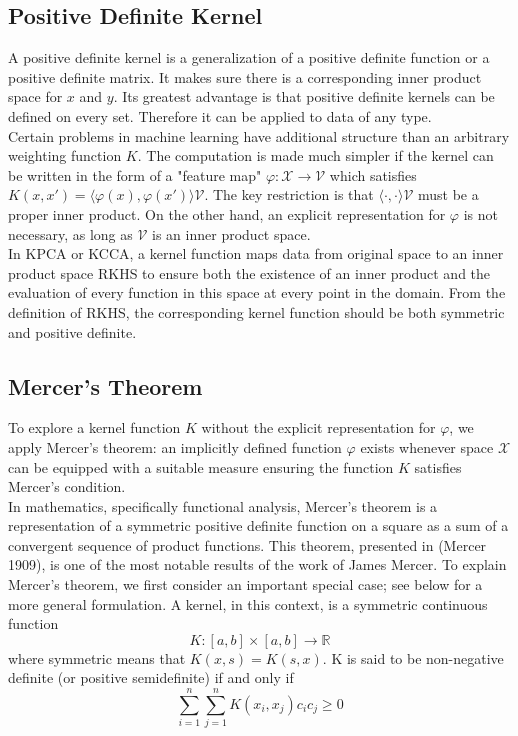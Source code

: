 \documentclass[12pt]{report} %
\begin{document}
\subsection{Positive Definite Kernel}
A positive definite kernel is a generalization of a positive definite function or a positive definite matrix. It makes sure there is a corresponding inner product space for $x$ and $y$. Its greatest advantage is that positive definite kernels can be defined on every set. Therefore it can be applied to data of any type.\\
Certain problems in machine learning have additional structure than an arbitrary weighting function $K$. The computation is made much simpler if the kernel can be written in the form of a "feature map" $\varphi:\mathcal{X}\to\mathcal{V}$ which satisfies $K(x,x')=\langle \varphi (x), \varphi (x') \rangle \mathcal{V}$. The key restriction is that $\langle \cdot, \cdot \rangle \mathcal{V}$ must be a proper inner product. On the other hand, an explicit representation for $\varphi$ is not necessary, as long as $\mathcal{V}$ is an inner product space\cite{PD}.\\
In KPCA or KCCA, a kernel function maps data from original space to an inner product space RKHS to ensure both the existence of an inner product and the evaluation of every function in this space at every point in the domain. From the definition of RKHS, the corresponding kernel function should be both symmetric and positive definite\cite{RKHS}.

\subsection{Mercer's Theorem}
To explore a kernel function $K$ without the explicit representation for $\varphi$, we apply Mercer's theorem: an implicitly defined function $\varphi$ exists whenever space $\mathcal {X}$ can be equipped with a suitable measure ensuring the function $K$ satisfies Mercer's condition.\\
In mathematics, specifically functional analysis, Mercer's theorem is a representation of a symmetric positive definite function on a square as a sum of a convergent sequence of product functions. This theorem, presented in (Mercer 1909), is one of the most notable results of the work of James Mercer\cite{MT}.
To explain Mercer's theorem, we first consider an important special case; see below for a more general formulation. A kernel, in this context, is a symmetric continuous function
\begin{equation}
K:[a,b] \times [a,b] \rightarrow \mathbb {R}
\end{equation}
where symmetric means that \( K(x, s) = K(s, x)\).
K is said to be non-negative definite (or positive semidefinite) if and only if
\begin{equation}
\sum _{i=1}^{n}\sum _{j=1}^{n}K(x_{i},x_{j})c_{i}c_{j}\geq 0
\end{equation}
\end{document}
